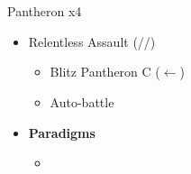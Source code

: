 \chapter[Chapter 4]{}
\begin{multicols}{2}
\renewcommand{\first}{[1] Relentless Assault (\com/\rav/\rav)}

\begin{battle}{Pantheron x4}
\begin{itemize}
    \item \first
    \begin{itemize}
        \item Blitz Pantheron C ($\leftarrow$)
        \item Auto-battle
    \end{itemize}
\end{itemize}
\end{battle}

\vfill
\begin{menu}
\begin{itemize}
    \item \textbf{Paradigms}
    \begin{itemize}
        \item {}%
{\paradigmline{\rav}{\rav}{}}%
{\paradigmline{\syn}{\sab}{}}%
{\paradigmline{\rav}{\med}{}}%
{\paradigmline[4]{\textit{\rav}}{\textit{[\sab]}}{}}%
{\paradigmline{[\rav]}{\rav}{}}
    \end{itemize}
    \columnbreak

\end{itemize}
\end{menu}
\end{multicols}


